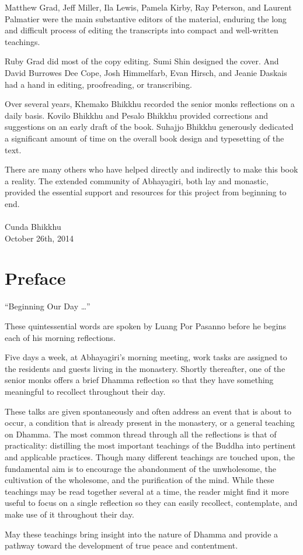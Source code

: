 \documentclass[11pt,openany]{memoir}
\begin{document}
Matthew Grad, Jeff Miller, Ila Lewis, Pamela Kirby, Ray Peterson, and
Laurent Palmatier were the main substantive editors of the material,
enduring the long and difficult process of editing the transcripts into
compact and well-written teachings.

Ruby Grad did most of the copy editing. Sumi Shin designed the cover.
And David Burrowes Dee Cope, Josh Himmelfarb, Evan Hirsch, and Jeanie
Daskais had a hand in editing, proofreading, or transcribing.

Over several years, Khemako Bhikkhu recorded the senior monks
reflections on a daily basis. Kovilo Bhikkhu and Pesalo Bhikkhu provided
corrections and suggestions on an early draft of the book. Suhajjo
Bhikkhu generously dedicated a significant amount of time on the overall
book design and typesetting of the text.

There are many others who have helped directly and indirectly to make
this book a reality. The extended community of Abhayagiri, both lay and
monastic, provided the essential support and resources for this project
from beginning to end.\\
\mbox{}\\
\noindent Cunda Bhikkhu\\
October 26th, 2014\nowidow[5]

\pagestyle{plain}
\chapter{Preface}
``Beginning Our Day \ldots{}''

These quintessential words are spoken by Luang Por Pasanno before he
begins each of his morning reflections.

Five days a week, at Abhayagiri's morning meeting, work tasks are
assigned to the residents and guests living in the monastery. Shortly
thereafter, one of the senior monks offers a brief Dhamma reflection so
that they have something meaningful to recollect throughout their day. 

These talks are given spontaneously and often address an event that is
about to occur, a condition that is already present in the monastery, or
a general teaching on Dhamma. The most common thread through all the
reflections is that of practicality: distilling the most important
teachings of the Buddha into pertinent and applicable practices. Though
many different teachings are touched upon, the fundamental aim is to
encourage the abandonment of the unwholesome, the cultivation of the
wholesome, and the purification of the mind.
While these teachings may be read together several at a time, the reader
might find it more useful to focus on a single reflection so they can
easily recollect, contemplate, and make use of it throughout their day. 

May these teachings bring insight into the nature of Dhamma and provide
a pathway toward the development of true peace and contentment.


\mainmatter
\end{document}
